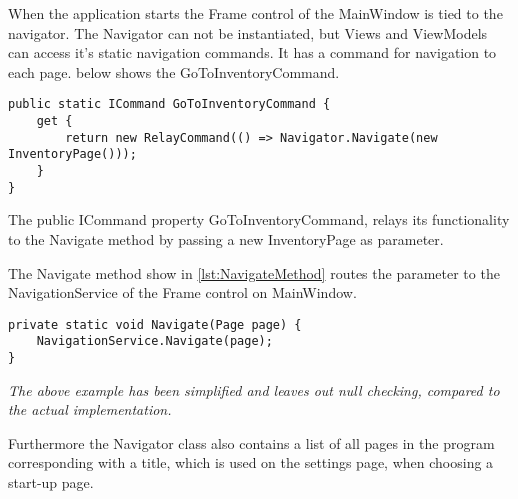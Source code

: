 When the application starts the Frame control of the MainWindow is tied to the navigator.
The Navigator can not be instantiated, but Views and ViewModels can access it's static navigation commands. It has a command for navigation to each page.  below shows the GoToInventoryCommand.

\begin{lstlisting}[caption=GoToInventoryCommand, label={lst:InventoryCommand}, language=CSharp]
public static ICommand GoToInventoryCommand {
	get {
		return new RelayCommand(() => Navigator.Navigate(new InventoryPage()));
	}
}
\end{lstlisting}

The public ICommand property GoToInventoryCommand, relays its functionality to the Navigate method by passing a new InventoryPage as parameter.

The Navigate method show in \cref{lst:NavigateMethod} routes the parameter to the NavigationService of the Frame control on MainWindow.

\begin{lstlisting}[caption=Navigate method, label={lst:NavigateMethod}, language=CSharp]
private static void Navigate(Page page) {
	NavigationService.Navigate(page);
}
\end{lstlisting}

\textit{The above example has been simplified and leaves out null checking, compared to the actual implementation.}

Furthermore the Navigator class also contains a list of all pages in the program corresponding with a title, which is used on the settings page, when choosing a start-up page.


